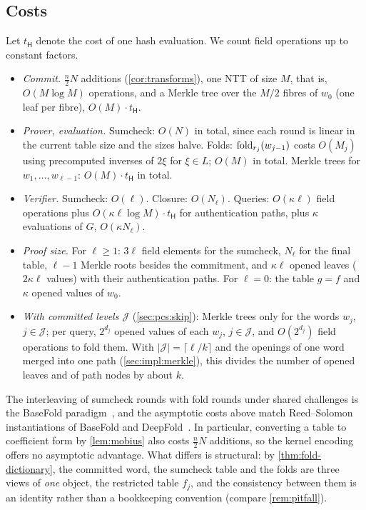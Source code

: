 \subsection{Costs}\label{sec:pcs:costs}

Let $t_{\mathsf{H}}$ denote the cost of one hash evaluation. We count field operations up to constant factors.

\begin{itemize}
  \item \emph{Commit.} $\tfrac{n}{2}N$ additions (\cref{cor:transforms}), one NTT of size $M$, that is, $O(M\log M)$ operations, and a Merkle tree over the $M/2$ fibres of $w_0$ (one leaf per fibre), $O(M)\cdot t_{\mathsf{H}}$.
  \item \emph{Prover, evaluation.} Sumcheck: $O(N)$ in total, since each round is linear in the current table size and the sizes halve.
  Folds: $\mathrm{fold}_{r_j}(w_{j-1})$ costs $O(M_j)$ using precomputed inverses of $2\xi$ for $\xi \in L$; $O(M)$ in total.
  Merkle trees for $w_1,\dots,w_{\ell-1}$: $O(M)\cdot t_{\mathsf{H}}$ in total.
  \item \emph{Verifier.} Sumcheck: $O(\ell)$. Closure: $O(N_\ell)$. Queries: $O(\kappa \ell)$ field operations plus $O(\kappa \ell \log M)\cdot t_{\mathsf{H}}$ for authentication paths, plus $\kappa$ evaluations of $G$, $O(\kappa N_\ell)$.
  \item \emph{Proof size.} For $\ell \ge 1$: $3\ell$ field elements for the sumcheck, $N_\ell$ for the final table, $\ell-1$ Merkle roots besides the commitment, and $\kappa\ell$ opened leaves ($2\kappa \ell$ values) with their authentication paths. For $\ell = 0$: the table $g = f$ and $\kappa$ opened values of $w_0$.
  \item \emph{With committed levels $\mathcal{J}$} (\cref{sec:pcs:skip}): Merkle trees only for the words $w_j$, $j \in \mathcal{J}$; per query, $2^{d_j}$ opened values of each $w_j$, $j \in \mathcal{J}$, and $O(2^{d_j})$ field operations to fold them. With $|\mathcal{J}| = \lceil \ell/k \rceil$ and the openings of one word merged into one path (\cref{sec:impl:merkle}), this divides the number of opened leaves and of path nodes by about $k$.
\end{itemize}

\begin{remark}\label{rem:basefold}
The interleaving of sumcheck rounds with fold rounds under shared challenges is the BaseFold paradigm~\cite{ZCF24}, and the asymptotic costs above match Reed--Solomon instantiations of BaseFold and DeepFold~\cite{GLHQTZ25}.
In particular, converting a table to coefficient form by \cref{lem:mobius} also costs $\tfrac{n}{2}N$ additions, so the kernel encoding offers no asymptotic advantage.
What differs is structural: by \cref{thm:fold-dictionary}, the committed word, the sumcheck table and the folds are three views of \emph{one} object, the restricted table $f_j$, and the consistency between them is an identity rather than a bookkeeping convention (compare \cref{rem:pitfall}).
\end{remark}

